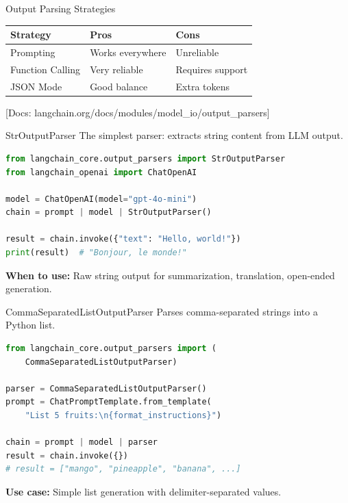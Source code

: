 \documentclass[aspectratio=169,11pt]{beamer}
\newcommand{\docref}[1]{{\scriptsize\color{docgray}[Docs: #1]}}
\begin{document}
\begin{frame}{Output Parsing Strategies}
\small
\begin{center}
\begin{tabular}{|l|p{3.5cm}|p{3.5cm}|}
\hline
\textbf{Strategy} & \textbf{Pros} & \textbf{Cons} \\
\hline
Prompting & Works everywhere & Unreliable \\
\hline
Function Calling & Very reliable & Requires support \\
\hline
JSON Mode & Good balance & Extra tokens \\
\hline
\end{tabular}
\end{center}

\docref{langchain.org/docs/modules/model\_io/output\_parsers}
\end{frame}

\begin{frame}[fragile]{StrOutputParser}
The simplest parser: extracts string content from LLM output.

\begin{lstlisting}[language=Python]
from langchain_core.output_parsers import StrOutputParser
from langchain_openai import ChatOpenAI

model = ChatOpenAI(model="gpt-4o-mini")
chain = prompt | model | StrOutputParser()

result = chain.invoke({"text": "Hello, world!"})
print(result)  # "Bonjour, le monde!"
\end{lstlisting}

\vspace{0.1cm}

\textbf{When to use:} Raw string output for summarization, translation, open-ended generation.
\end{frame}

\begin{frame}[fragile]{CommaSeparatedListOutputParser}
Parses comma-separated strings into a Python list.

\begin{lstlisting}[language=Python]
from langchain_core.output_parsers import (
    CommaSeparatedListOutputParser)

parser = CommaSeparatedListOutputParser()
prompt = ChatPromptTemplate.from_template(
    "List 5 fruits:\n{format_instructions}")

chain = prompt | model | parser
result = chain.invoke({})
# result = ["mango", "pineapple", "banana", ...]
\end{lstlisting}

\vspace{0.1cm}

\textbf{Use case:} Simple list generation with delimiter-separated values.
\end{frame}
\end{document}
